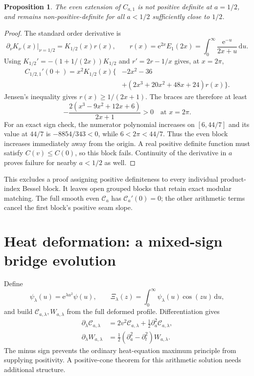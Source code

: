 \documentclass[11pt,letterpaper]{article}
\numberwithin{equation}{section}
\newtheorem{proposition}{Proposition}[section]
\theoremstyle{remark}\newtheorem{remark}[proposition]{Remark}
\newcommand{\dd}{\,\mathrm d}
\newcommand{\calC}{\mathcal C}
\newcommand{\ee}{\mathrm e}
\begin{document}
\begin{proposition}
The even extension of $C_{a,1}$ is not positive definite at $a=1/2$, and remains non-positive-definite for all $a<1/2$ sufficiently close to $1/2$.
\end{proposition}
\begin{proof}
The standard order derivative \cite{dlmfBessel} is
\[
 \left.\partial_\nu K_\nu(x)\right|_{\nu=1/2}
 =K_{1/2}(x)r(x),\qquad
 r(x)=\ee^{2x}E_1(2x)
     =\int_0^\infty\frac{\ee^{-u}}{2x+u}\dd u.
\]
Using $K_{1/2}'=-(1+1/(2x))K_{1/2}$ and $r'=2r-1/x$ gives, at $x=2\pi$,
\begin{align*}
 C_{1/2,1}'(0+)
 =x^2K_{1/2}(x)\{&-2x^2-36\\
 &+(2x^3+20x^2+48x+24)r(x)\}.
\end{align*}
Jensen's inequality gives $r(x)\ge1/(2x+1)$. The braces are therefore at least
\[
 -\frac{2(x^3-9x^2+12x+6)}{2x+1}>0
 \quad\text{at }x=2\pi.
\]
For an exact sign check, the numerator polynomial increases on $[6,44/7]$ and its value at $44/7$ is $-8854/343<0$, while $6<2\pi<44/7$.
Thus the even block increases immediately away from the origin. A real positive definite function must satisfy $C(v)\le C(0)$, so this block fails. Continuity of the derivative in $a$ proves failure for nearby $a<1/2$ as well.
\end{proof}
This excludes a proof assigning positive definiteness to every individual product-index Bessel block. It leaves open grouped blocks that retain exact modular matching. The full smooth even $\calC_a$ has $\calC_a'(0)=0$; the other arithmetic terms cancel the first block's positive seam slope.

\section{Heat deformation: a mixed-sign bridge evolution}
Define
\[
 \psi_\lambda(u)=\ee^{\lambda u^2}\psi(u),\qquad
 \Xi_\lambda(z)=\int_0^\infty\psi_\lambda(u)\cos(zu)\dd u,
\]
and build $\calC_{a,\lambda},W_{a,\lambda}$ from the full deformed profile.
Differentiation gives
\begin{align}
 \partial_\lambda\calC_{a,\lambda}
 &=2v^2\calC_{a,\lambda}
   +\tfrac12\partial_a^2\calC_{a,\lambda},\\
 \partial_\lambda W_{a,\lambda}
 &=\boxed{\tfrac12(\partial_a^2-\partial_t^2)W_{a,\lambda}.}
 \label{eq:heat}
\end{align}
The minus sign prevents the ordinary heat-equation maximum principle from supplying positivity. A positive-cone theorem for this arithmetic solution needs additional structure.
\end{document}

